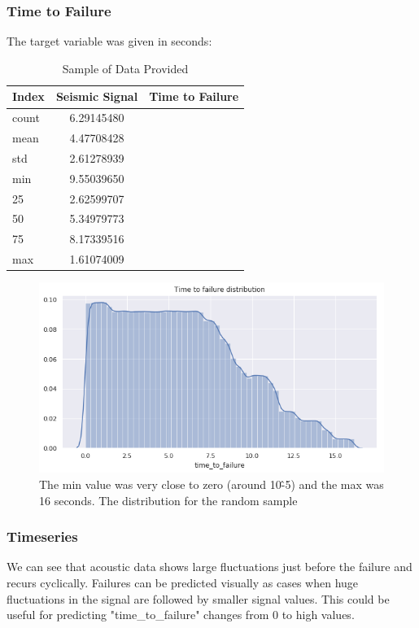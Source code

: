 \documentclass[]{llncs}
\begin{document}
\subsubsection{Time to Failure}
The target variable was given in seconds:
\begin{table}[h!]
	\begin{center}
		\caption{Sample of Data Provided}
		\label{tab:table1}
		\begin{tabular}{l|c|r} %
			\textbf{Index} & \textbf{Seismic Signal} & \textbf{Time to Failure}\\
			\hline
			count &  6.29145480\\ 
			mean & 4.47708428 \\ 
			std &  2.61278939\\ 
			min &  9.55039650\\ 
			25 & 2.62599707 \\ 
			50 &  5.34979773\\ 
			75 &  8.17339516\\ 
			max & 1.61074009 \\ 
		\end{tabular}
	\end{center}
\end{table}
\begin{figure}[h]
	\centering
	\includegraphics[width=0.7\linewidth]{../GPUProject/timeToFailureDistribution}
	\caption[]{The min value was very close to zero (around 10\^-5) and the max was 16 seconds. The distribution for the random sample}
	\label{fig:timetofailuredistribution}
\end{figure}
\subsubsection{Timeseries}
We can see that acoustic data shows large fluctuations just before the failure and recurs cyclically. Failures can be predicted visually as cases when huge fluctuations in the signal are followed by smaller signal values. This could be useful for predicting "time\_to\_failure" changes from 0 to high values.
\end{document}
